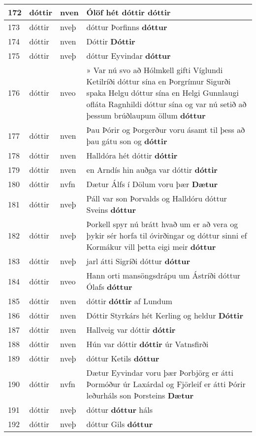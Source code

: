 \documentclass{article}
\begin{document}
\begin{longtable}{p{1cm}|p{1cm}|p{1cm}|p{13cm}}
\hline
172&dóttir&nven&Ólöf hét dóttir \textbf{dóttir} \\
\hline
173&dóttir&nveþ&dóttur Þorfinns \textbf{dóttur} \\
\hline
174&dóttir&nven&Dóttir \textbf{Dóttir} \\
\hline
175&dóttir&nveþ&dóttur Eyvindar \textbf{dóttur} \\
\hline
176&dóttir&nveo&» Var nú svo að Hólmkell gifti Víglundi Ketilríði dóttur sína en Þorgrímur Sigurði spaka Helgu dóttur sína en Helgi Gunnlaugi ofláta Ragnhildi dóttur sína og var nú setið að þessum brúðlaupum öllum \textbf{dóttur} \\
\hline
177&dóttir&nven&Þau Þórir og Þorgerður voru ásamt til þess að þau gátu son og \textbf{dóttir} \\
\hline
178&dóttir&nven&Halldóra hét dóttir \textbf{dóttir} \\
\hline
179&dóttir&nven&en Arndís hin auðga var dóttir \textbf{dóttir} \\
\hline
180&dóttir&nvfn&Dætur Álfs í Dölum voru þær \textbf{Dætur} \\
\hline
181&dóttir&nveþ&Páll var son Þorvalds og Halldóru dóttur Sveins \textbf{dóttur} \\
\hline
182&dóttir&nveþ&Þorkell spyr nú brátt hvað um er að vera og þykir sér horfa til óvirðingar og dóttur sinni ef Kormákur vill þetta eigi meir \textbf{dóttur} \\
\hline
183&dóttir&nveþ&jarl átti Sigríði dóttur \textbf{dóttur} \\
\hline
184&dóttir&nveo&Hann orti mansöngsdrápu um Ástríði dóttur Ólafs \textbf{dóttur} \\
\hline
185&dóttir&nven&dóttir \textbf{dóttir} af Lundum\\
\hline
186&dóttir&nven&Dóttir Styrkárs hét Kerling og heldur \textbf{Dóttir} \\
\hline
187&dóttir&nven&Hallveig var dóttir \textbf{dóttir} \\
\hline
188&dóttir&nven&Hún var dóttir \textbf{dóttir} úr Vatnsfirði\\
\hline
189&dóttir&nveþ&dóttur Ketils \textbf{dóttur} \\
\hline
190&dóttir&nvfn&Dætur Eyvindar voru þær Þorbjörg er átti Þormóður úr Laxárdal og Fjörleif er átti Þórir leðurháls son Þorsteins \textbf{Dætur} \\
\hline
191&dóttir&nveþ&dóttur \textbf{dóttur} háls\\
\hline
192&dóttir&nveþ&dóttur Gils \textbf{dóttur} \\

\end{longtable}
\end{document}
